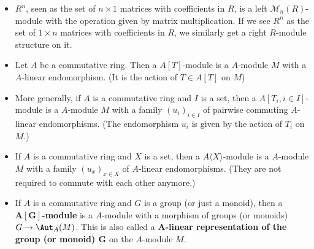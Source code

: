 \begin{example}
\mbox{}
\begin{itemize}
\item $R^n$, seen as the set of $n\times1$ matrices with coefficients in $R$, is a left $\mathcal{M}_n(R)$-module with the operation given by matrix multiplication. If we see $R^n$ as the set of $1\times n$ matrices with coefficients in $R$, we similarly get a right $R$-module structure on it.
\item Let $A$ be a commutative ring. Then a $A[T]$-module is a $A$-module $M$ with a $A$-linear endomorphism. (It is the action of $T\in A[T]$ on $M$)
\item More generally, if $A$ is a commutative ring and $I$ is a set, then a $A[T_i,i\in I]$-module is a $A$-module $M$ with a family $(u_i)_{i\in I}$ of pairwise commuting $A$-linear endomorphisms. (The endomorphism $u_i$ is given by the action of $T_i$ on $M$.)
\item If $A$ is a commutative ring and $X$ is a set, then a $A\langle X\rangle$-module is a $A$-module $M$ with a family $(u_x)_{x\in X}$ of $A$-linear endomorphisms. (They are not required to commute with each other anymore.)
\item If $A$ is a commutative ring and $G$ is a group (or just a monoid), then a \textbf{$\bm{A[G]}$-module} is a $A$-module with a morphism of groups (or monoids) $G\to\Aut_A(M)$. This is also called a \textbf{$\bm{A}$-linear representation of the group (or monoid) $\bm{G}$} on the $A$-module $M$.
\end{itemize}
\end{example}
